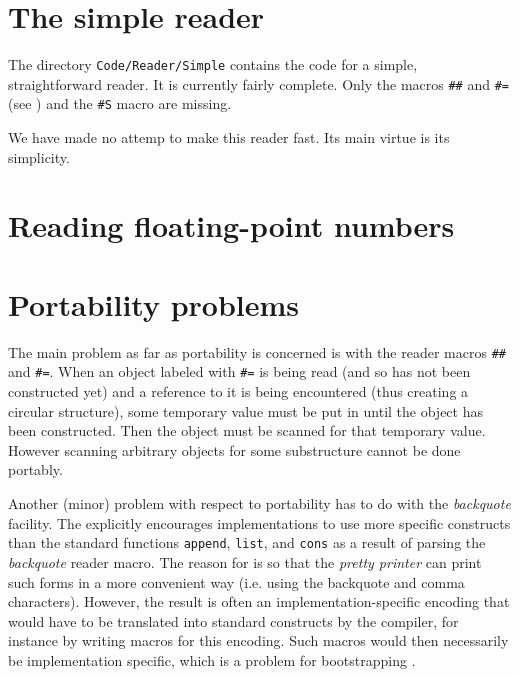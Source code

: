 \section{The simple reader}

The directory \texttt{Code/Reader/Simple} contains the code for a
simple, straightforward reader.  It is currently fairly complete.
Only the macros \texttt{\#\#} and \texttt{\#=} (see
) and the \texttt{\#S} macro
are missing.  

We have made no attemp to make this reader fast.  Its main virtue is
its simplicity.  

\section{Reading floating-point numbers}

\section{Portability problems}
\label{sec-reader-portability-problems}

The main problem as far as portability is concerned is with the reader
macros \texttt{\#\#} and \texttt{\#=}.  When an object labeled with
\texttt{\#=} is being read (and so has not been constructed yet) and a
reference to it is being encountered (thus creating a circular
structure), some temporary value must be put in until the object has
been constructed.  Then the object must be scanned for that temporary
value.  However scanning arbitrary objects for some substructure
cannot be done portably.

Another (minor) problem with respect to portability has to do with the
\emph{backquote} facility.  The \hs{} explicitly encourages
implementations to use more specific constructs than the standard
\commonlisp{} functions \texttt{append}, \texttt{list}, and \texttt{cons} as a
result of parsing the \emph{backquote} reader macro.  The reason for
is so that the \emph{pretty printer} can print such forms in a more
convenient way (i.e. using the backquote and comma characters).
However, the result is often an implementation-specific encoding that
would have to be translated into standard \commonlisp{} constructs by the
compiler, for instance by writing macros for this encoding.  Such
macros would then necessarily be implementation specific, which is a
problem for bootstrapping \sysname{}.  

